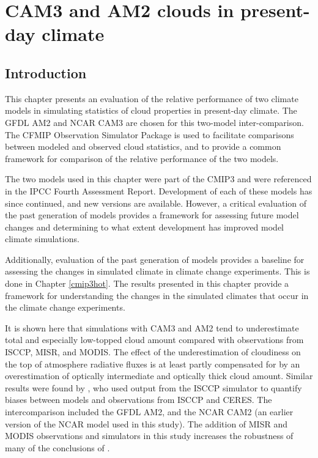 \chapter{CAM3 and AM2 clouds in present-day climate}
\label{cmip3amip}
\section{Introduction}
This chapter presents an evaluation of the relative performance of two climate models in simulating statistics of cloud properties in present-day climate. The GFDL AM2 and NCAR CAM3 are chosen for this two-model inter-comparison. The CFMIP Observation Simulator Package is used to facilitate comparisons between modeled and observed cloud statistics, and to provide a common framework for comparison of the relative performance of the two models.

The two models used in this chapter were part of the CMIP3 and were referenced in the IPCC Fourth Assessment Report. Development of each of these models has since continued, and new versions are available. However, a critical evaluation of the past generation of models provides a framework for assessing future model changes and determining to what extent development has improved model climate simulations.

Additionally, evaluation of the past generation of models provides a baseline for assessing the changes in simulated climate in climate change experiments. This is done in Chapter \ref{cmip3hot}. The results presented in this chapter provide a framework for understanding the changes in the simulated climates that occur in the climate change experiments.

It is shown here that simulations with CAM3 and AM2 tend to underestimate total and especially low-topped cloud amount compared with observations from ISCCP, MISR, and MODIS. The effect of the underestimation of cloudiness on the top of atmosphere radiative fluxes is at least partly compensated for by an overestimation of optically intermediate and optically thick cloud amount. Similar results were found by \cite{zhang_et_al_2005}, who used output from the ISCCP simulator to quantify biases between models and observations from ISCCP and CERES. The intercomparison included the GFDL AM2, and the NCAR CAM2 (an earlier version of the NCAR model used in this study). The addition of MISR and MODIS observations and simulators in this study increases the robustness of many of the conclusions of \cite{zhang_et_al_2005}.

